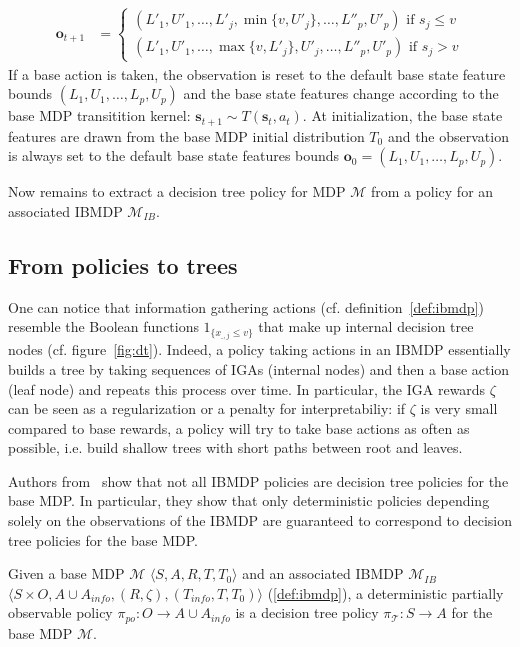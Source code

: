 \begin{definition}
\begin{itemize}
\begin{align*}
    \boldsymbol{o}_{t+1} &= \begin{cases}
        (L'_1, U'_1, \dots , L'_j, \min\{v, U'_j\}, \dots , L''_p, U'_p) \text{ if } s_j \leq v\\
        (L'_1, U'_1, \dots , \max\{v, L'_j\}, U'_j, \dots , L''_p, U'_p) \text{ if } s_j > v
    \end{cases}
\end{align*}
If a base action is taken, the observation is reset to the default base state feature bounds $(L_1, U_1,\dots, L_p, U_p)$ and the base state features change according to the base MDP transitition kernel: $\boldsymbol{s}_{t+1}\sim T(\boldsymbol{s}_t, a_t)$.
At initialization, the base state features are drawn from the base MDP initial distribution $T_0$ and the observation is always set to the default base state features bounds $\boldsymbol{o}_0=(L_1, U_1,\dots, L_p, U_p)$.
\end{itemize}
\end{definition}

Now remains to extract a decision tree policy for MDP $\mathcal{M}$ from a policy for an associated IBMDP $\mathcal{M}_{IB}$. 

\subsection{From policies to trees}

One can notice that information gathering actions (cf. definition~\ref{def:ibmdp}) resemble the Boolean functions $1_{\{x_{\_, j} \leq v\}}$ that make up internal decision tree nodes (cf. figure~\ref{fig:dt}).
Indeed, a policy taking actions in an IBMDP essentially builds a tree by taking sequences of IGAs (internal nodes) and then a base action (leaf node) and repeats this process over time.
In particular, the IGA rewards $\zeta$ can be seen as a regularization or a penalty for interpretabiliy: if $\zeta$ is very small compared to base rewards, a policy will try to take base actions as often as possible, i.e. build shallow trees with short paths between root and leaves.

Authors from~\cite{topin2021iterative} show that not all IBMDP policies are decision tree policies for the base MDP.
In particular, they show that only deterministic policies depending solely on the observations of the IBMDP are guaranteed to correspond to decision tree policies for the base MDP.

\begin{proposition}\label{def:po-policy}
    Given a base MDP $\mathcal{M}$ $\langle S, A, R, T, T_0\rangle$ and an associated IBMDP $\mathcal{M}_{IB}$ $\langle S \times O,A \cup A_{info}, (R, \zeta), (T_{info}, T, T_0)\rangle$ (\ref{def:ibmdp}), a deterministic partially observable policy $\pi_{po}: O \rightarrow A\cup A_{info}$ is a decision tree policy $\pi_{\mathcal{T}}: S \rightarrow A$ for the base MDP $\mathcal{M}$.
\end{proposition}

